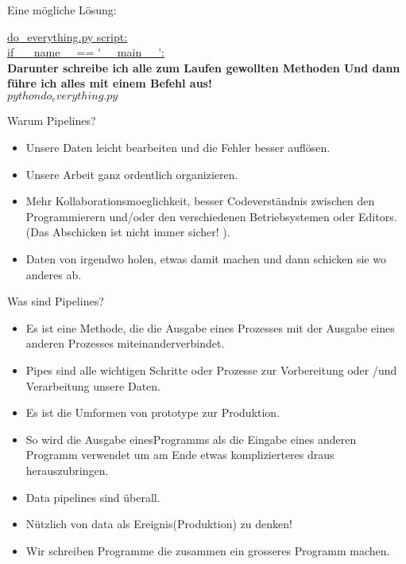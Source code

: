 \documentclass[t]{beamer}       %
\begin{document}
\begin{frame}{Eine mögliche Lösung:}


\url{do_everything.py script:}\\
\url{if __name__== '__main__':}\\
\bigskip
\textbf{Darunter schreibe ich alle zum Laufen gewollten Methoden
Und dann führe ich alles mit einem Befehl aus!}\\
\bigskip
$python do_everything.py$\\

\end{frame}






\begin{frame}{Warum Pipelines?}
\begin{itemize}
\item Unsere Daten leicht bearbeiten und die Fehler besser auflösen.
\item Unsere Arbeit ganz ordentlich organizieren.
\item Mehr Kollaborationsmoeglichkeit, besser Codeverständnis zwischen den Programmierern und/oder den verschiedenen Betriebsystemen oder Editors. (Das Abschicken ist nicht immer sicher! ).
\item Daten von irgendwo holen, etwas damit machen und dann schicken sie wo anderes ab.

\end{itemize}
\end{frame}



\begin{frame}{Was sind Pipelines?}

\begin{itemize}
\item Es ist eine Methode, die die Ausgabe eines Prozesses mit der Ausgabe eines anderen Prozesses miteinanderverbindet.
\item  Pipes sind alle wichtigen Schritte oder Prozesse zur Vorbereitung oder /und Verarbeitung unsere Daten.
\item Es ist die Umformen von prototype zur Produktion.
\item So wird die Ausgabe einesProgramms als die Eingabe eines anderen Programm verwendet um am Ende etwas komplizierteres draus herauszubringen.
\item Data pipelines sind überall.
\item Nützlich von data als Ereignis(Produktion) zu denken!
\item Wir schreiben Programme die zusammen ein grosseres Programm machen.
\end{itemize}
\end{frame}
\end{document}
